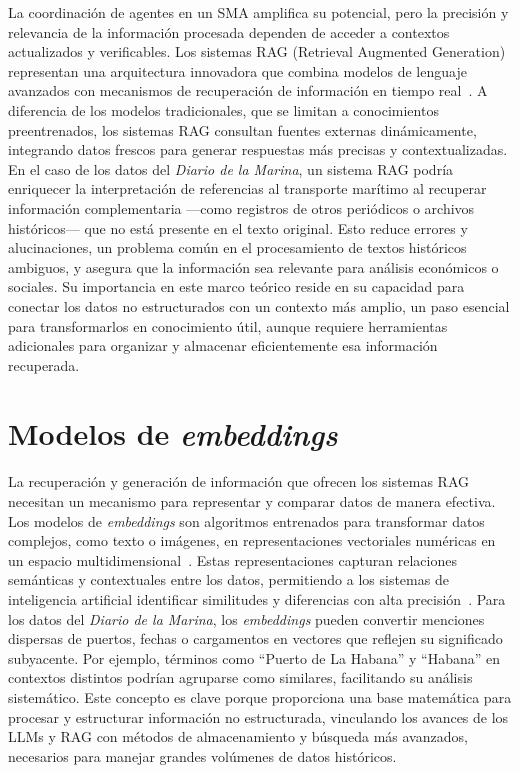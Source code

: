 La coordinación de agentes en un SMA amplifica su potencial, pero la precisión y relevancia de la información procesada dependen de acceder a contextos actualizados y verificables. Los sistemas RAG (Retrieval Augmented Generation) representan una arquitectura innovadora que combina modelos de lenguaje avanzados con mecanismos de recuperación de información en tiempo real~\cite{gao2024retrievalaugmented,lewis2020retrievalaugmented}. A diferencia de los modelos tradicionales, que se limitan a conocimientos preentrenados, los sistemas RAG consultan fuentes externas dinámicamente, integrando datos frescos para generar respuestas más precisas y contextualizadas.
En el caso de los datos del \textit{Diario de la Marina}, un sistema RAG podría enriquecer la interpretación de referencias al transporte marítimo al recuperar información complementaria —como registros de otros periódicos o archivos históricos— que no está presente en el texto original. Esto reduce errores y alucinaciones, un problema común en el procesamiento de textos históricos ambiguos, y asegura que la información sea relevante para análisis económicos o sociales. Su importancia en este marco teórico reside en su capacidad para conectar los datos no estructurados con un contexto más amplio, un paso esencial para transformarlos en conocimiento útil, aunque requiere herramientas adicionales para organizar y almacenar eficientemente esa información recuperada.

\section{Modelos de \textit{embeddings}}\label{seq_5}

La recuperación y generación de información que ofrecen los sistemas RAG necesitan un mecanismo para representar y comparar datos de manera efectiva. Los modelos de \textit{embeddings} son algoritmos entrenados para transformar datos complejos, como texto o imágenes, en representaciones vectoriales numéricas en un espacio multidimensional~\cite{mikolov2013efficient}. Estas representaciones capturan relaciones semánticas y contextuales entre los datos, permitiendo a los sistemas de inteligencia artificial identificar similitudes y diferencias con alta precisión~\cite{mikolov2013efficient}.
Para los datos del \textit{Diario de la Marina}, los \textit{embeddings} pueden convertir menciones dispersas de puertos, fechas o cargamentos en vectores que reflejen su significado subyacente. Por ejemplo, términos como ``Puerto de La Habana'' y ``Habana'' en contextos distintos podrían agruparse como similares, facilitando su análisis sistemático. Este concepto es clave porque proporciona una base matemática para procesar y estructurar información no estructurada, vinculando los avances de los LLMs y RAG con métodos de almacenamiento y búsqueda más avanzados, necesarios para manejar grandes volúmenes de datos históricos.


